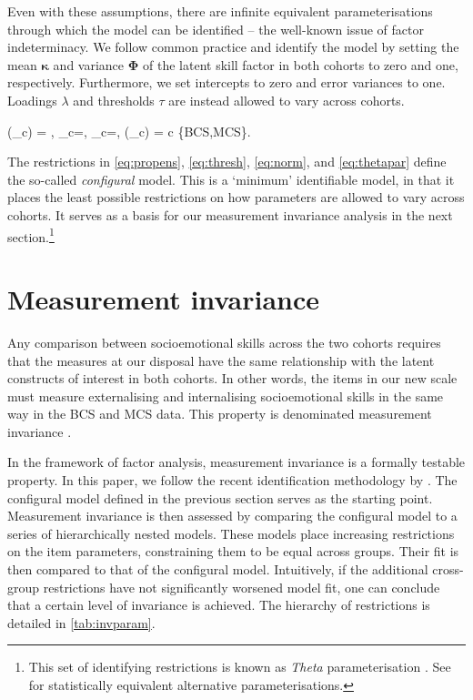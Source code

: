 Even with these assumptions, there are infinite equivalent parameterisations through which the model can be identified -- the well-known issue of factor indeterminacy. We follow common practice and identify the model by setting the mean $\bm{\kappa}$ and variance $\bm{\Phi}$ of the latent skill factor in both cohorts to zero and one, respectively. Furthermore, we set intercepts to zero and error variances to one. Loadings $\lambda$ and thresholds $\tau$ are instead allowed to vary across cohorts.

\be\label{eq:thetapar}
(\bm{\Phi}_c) = , \quad \bm{\kappa}_c=, \quad \bm{\nu}_c=, \quad {} \; (\bm{\Psi}_c) =  \qquad \forall c \in \{BCS,MCS\}.
\ee

The restrictions in \eqref{eq:propens}, \eqref{eq:thresh}, \eqref{eq:norm}, and \eqref{eq:thetapar} define the so-called \emph{configural} model. This is a `minimum' identifiable model, in that it places the least possible restrictions on how parameters are allowed to vary across cohorts. It serves as a basis for our measurement invariance analysis in the next section.\footnote{This set of identifying restrictions is known as \emph{Theta} parameterisation \citep{Wu2016a}. See  for statistically equivalent alternative parameterisations.}

\section{Measurement invariance \label{sec:measinv}}

Any comparison between socioemotional skills across the two cohorts requires that the measures at our disposal have the same relationship with the latent constructs of interest in both cohorts. In other words, the items in our new scale must measure externalising and internalising socioemotional skills in the same way in the BCS and MCS data. This property is denominated measurement invariance \citep{Vandenberg2000a,Putnick2016}.

In the framework of factor analysis, measurement invariance is a formally testable property. In this paper, we follow the recent identification methodology by \citet{Wu2016a}. The configural model defined in the previous section serves as the starting point. Measurement invariance is then assessed by comparing the configural model to a series of hierarchically nested models. These models place increasing restrictions on the item parameters, constraining them to be equal across groups. Their fit is then compared to that of the configural model. Intuitively, if the additional cross-group restrictions have not significantly worsened model fit, one can conclude that a certain level of invariance is achieved. The hierarchy of restrictions is detailed in \autoref{tab:invparam}.

